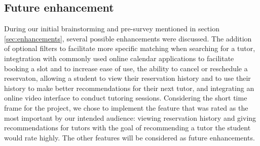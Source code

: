 

\subsection{Future enhancement}
During our initial brainstorming and pre-survey mentioned in section \ref{sec:enhancements}, several possible enhancements were discussed. The addition of optional filters to facilitate more specific matching when searching for a tutor, integtration with commonly used online calendar applications to facilitate booking a slot and to increase ease of use, the ability to cancel or reschedule a reservaton, allowing a student to view their reservation history and to use their history to make better recommendations for their next tutor, and integrating an online video interface to conduct tutoring sessions. Considering the short time frame for the project, we chose to implement the feature that was rated as the most important by our intended audience: viewing reservation history and giving recommendations for tutors with the goal of recommending a tutor the student would rate highly. The other features will be considered as future enhancements.